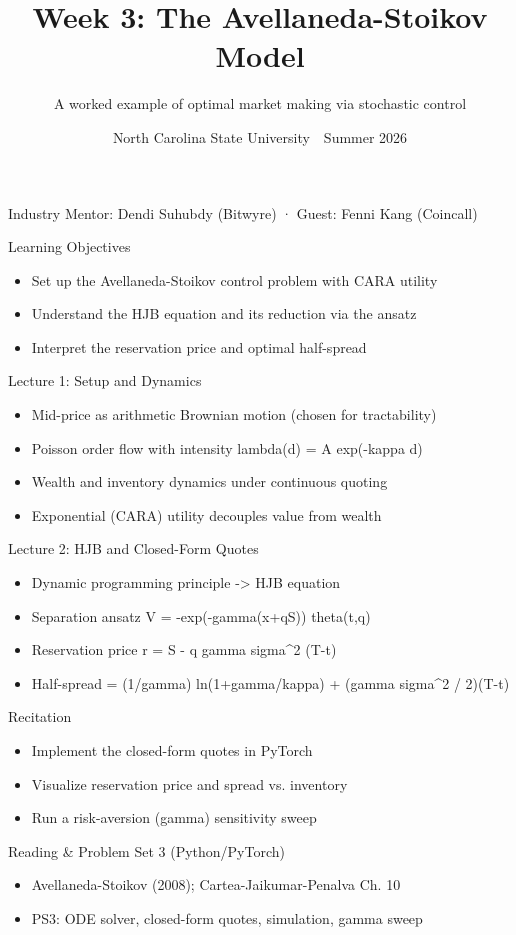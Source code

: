 \documentclass[aspectratio=169,11pt]{beamer}
\title{Week 3: The Avellaneda-Stoikov Model}
\subtitle{A worked example of optimal market making via stochastic control}
\date{North Carolina State University \,\textbar\, Summer 2026}
\begin{document}
\begin{frame}[plain]\titlepage
\begin{center}\tiny Industry Mentor: Dendi Suhubdy (Bitwyre)  ·  Guest: Fenni Kang (Coincall)\end{center}\end{frame}
\begin{frame}{Learning Objectives}
\begin{itemize}
  \item Set up the Avellaneda-Stoikov control problem with CARA utility
  \item Understand the HJB equation and its reduction via the ansatz
  \item Interpret the reservation price and optimal half-spread
\end{itemize}\end{frame}
\begin{frame}{Lecture 1: Setup and Dynamics}
\begin{itemize}
  \item Mid-price as arithmetic Brownian motion (chosen for tractability)
  \item Poisson order flow with intensity lambda(d) = A exp(-kappa d)
  \item Wealth and inventory dynamics under continuous quoting
  \item Exponential (CARA) utility decouples value from wealth
\end{itemize}\end{frame}
\begin{frame}{Lecture 2: HJB and Closed-Form Quotes}
\begin{itemize}
  \item Dynamic programming principle -\textgreater{} HJB equation
  \item Separation ansatz V = -exp(-gamma(x+qS)) theta(t,q)
  \item Reservation price r = S - q gamma sigma\textasciicircum{}2 (T-t)
  \item Half-spread = (1/gamma) ln(1+gamma/kappa) + (gamma sigma\textasciicircum{}2 / 2)(T-t)
\end{itemize}\end{frame}
\begin{frame}{Recitation}
\begin{itemize}
  \item Implement the closed-form quotes in PyTorch
  \item Visualize reservation price and spread vs. inventory
  \item Run a risk-aversion (gamma) sensitivity sweep
\end{itemize}\end{frame}
\begin{frame}{Reading \& Problem Set 3 (Python/PyTorch)}
\begin{itemize}
  \item Avellaneda-Stoikov (2008); Cartea-Jaikumar-Penalva Ch. 10
  \item PS3: ODE solver, closed-form quotes, simulation, gamma sweep
\end{itemize}\end{frame}
\end{document}
